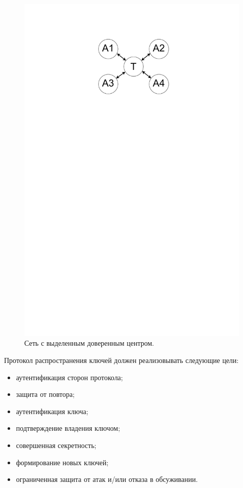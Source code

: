 \documentclass[a4paper]{article}
\begin{document}
\begin{figure}[H]
\begin{center}
\begin{minipage}[h]{0.43\linewidth}
	\includegraphics[width=1\linewidth]{pic2.pdf}
	\caption{Сеть с выделенным доверенным центром.}
	\label{p3}
	\end{minipage}
	\end{center}
\end{figure}

Протокол распространения ключей должен реализовывать следующие цели:
\begin{itemize}
    \item аутентификация сторон протокола;
    \item защита от повтора;
    \item аутентификация ключа;
    \item подтверждение владения ключом;
    \item совершенная секретность;
    \item формирование новых ключей;
    \item ограниченная защита от атак и/или отказа в обсуживании.
\end{itemize}
\end{document}
